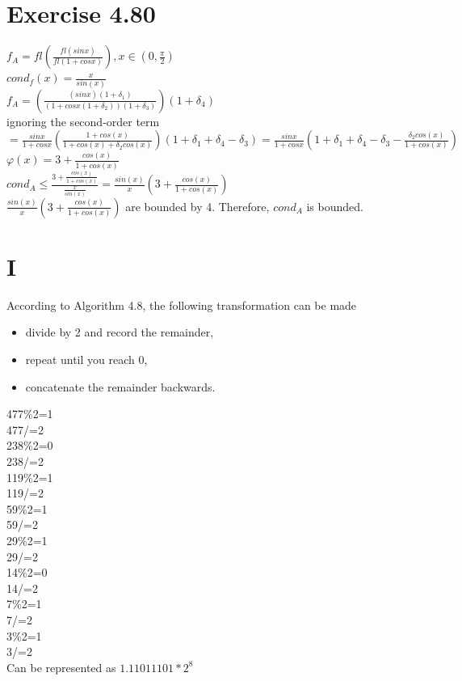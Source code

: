 \documentclass[a4paper]{article}
\begin{document}
\section*{Exercise 4.80}

$f_A=fl(\frac{fl(sinx)}{fl(1+cosx)}),x\in (0,\frac{\pi}{2})$\\
$cond_f(x)=\frac{x}{sin(x)}$\\
$f_A=(\frac{(sinx)(1+\delta_1)}{(1+cosx(1+\delta_2))(1+\delta_3)})(1+\delta_4)$\\
ignoring the second-order term\\
$=\frac{sinx}{1+cosx}(\frac{1+cos(x)}{1+cos(x)+\delta_2cos(x)})(1+\delta_1+\delta_4-\delta_3)=\frac{sinx}{1+cosx}(1+\delta_1+\delta_4-\delta_3-\frac{\delta_2cos(x)}{1+cos(x)})$\\
$\varphi(x)=3+\frac{cos(x)}{1+cos(x)}$\\
$cond_A \leq \frac{3+\frac{cos(x)}{1+cos(x)}}{\frac{x}{sin(x)}}=\frac{sin(x)}{x}(3+\frac{cos(x)}{1+cos(x)})$\\
$\frac{sin(x)}{x}(3+\frac{cos(x)}{1+cos(x)})$ are bounded by 4. Therefore, $cond_A$ is bounded.\\


\section*{I}
According to Algorithm 4.8, the following transformation can be made\\
\begin{itemize}
  \item divide by 2 and record the remainder,\\
  \item repeat until you reach 0,\\
  \item concatenate the remainder backwards.\\
\end{itemize}

477\%2=1\\
477/=2\\
238\%2=0\\
238/=2\\
119\%2=1\\
119/=2\\
59\%2=1\\
59/=2\\
29\%2=1\\
29/=2\\
14\%2=0\\
14/=2\\
7\%2=1\\
7/=2\\
3\%2=1\\
3/=2\\
Can be represented as $1.11011101*2^8$\\
\end{document}
